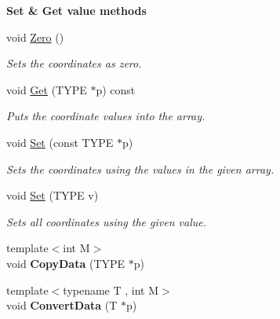 \begin{Indent}\textbf{ Set \& Get value methods}\par
\begin{DoxyCompactItemize}
\item 
\mbox{\label{classcy_1_1_point_ab638768c49af432d390f06ce76e95f7a}} 
void \mbox{\hyperlink{classcy_1_1_point_ab638768c49af432d390f06ce76e95f7a}{Zero}} ()
\begin{DoxyCompactList}\small\item\em Sets the coordinates as zero. \end{DoxyCompactList}\item 
\mbox{\label{classcy_1_1_point_aff929054b35f72e1aeee9ec1c7155e2f}} 
void \mbox{\hyperlink{classcy_1_1_point_aff929054b35f72e1aeee9ec1c7155e2f}{Get}} (T\+Y\+PE $\ast$p) const
\begin{DoxyCompactList}\small\item\em Puts the coordinate values into the array. \end{DoxyCompactList}\item 
\mbox{\label{classcy_1_1_point_a63754d8cb099039c9fdf6a08aa2f0a4d}} 
void \mbox{\hyperlink{classcy_1_1_point_a63754d8cb099039c9fdf6a08aa2f0a4d}{Set}} (const T\+Y\+PE $\ast$p)
\begin{DoxyCompactList}\small\item\em Sets the coordinates using the values in the given array. \end{DoxyCompactList}\item 
\mbox{\label{classcy_1_1_point_ab37011b87d9a72e410fb0e59abc45577}} 
void \mbox{\hyperlink{classcy_1_1_point_ab37011b87d9a72e410fb0e59abc45577}{Set}} (T\+Y\+PE v)
\begin{DoxyCompactList}\small\item\em Sets all coordinates using the given value. \end{DoxyCompactList}\item 
\mbox{\label{classcy_1_1_point_a27b14e3e735943220a7a81694cd19c07}} 
{\footnotesize template$<$int M$>$ }\\void {\bfseries Copy\+Data} (T\+Y\+PE $\ast$p)
\item 
\mbox{\label{classcy_1_1_point_a10dbb5ea2efbf36b9aa590e5397704ea}} 
{\footnotesize template$<$typename T , int M$>$ }\\void {\bfseries Convert\+Data} (T $\ast$p)
\end{DoxyCompactItemize}
\end{Indent}
